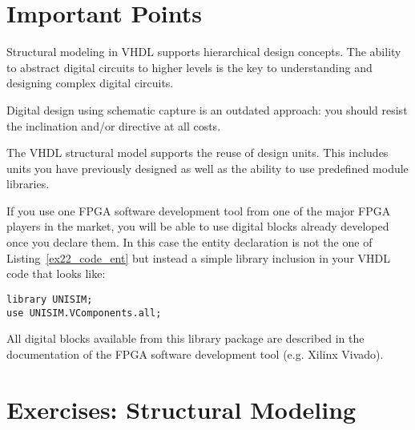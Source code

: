 \section{Important Points}
\begin{my_list}
\item Structural modeling in VHDL supports hierarchical design concepts. The ability to abstract digital circuits to higher levels is the key to understanding and designing complex digital circuits.

\item Digital design using schematic capture is an outdated approach: you should resist the inclination and/or directive at all costs.

\item The VHDL structural model supports the reuse of design units. This includes units you have previously designed as well as the ability to use predefined module libraries.

\item If you use one FPGA software development tool from one of the major FPGA players in the market, you will be able to use digital blocks already developed once you declare them. In this case the entity declaration is not the one of Listing~\ref{ex22_code_ent} but instead a simple library inclusion in your VHDL code that looks like:

\vspace*{5pt}
\noindent
\begin{minipage}{0.95\textwidth}
\texttt{library UNISIM;}\\
\texttt{use UNISIM.VComponents.all;}
\end{minipage}

All digital blocks available from this library package are described in the documentation of the FPGA software development tool (e.g. Xilinx Vivado).
\end{my_list}

\section{Exercises: Structural Modeling}

